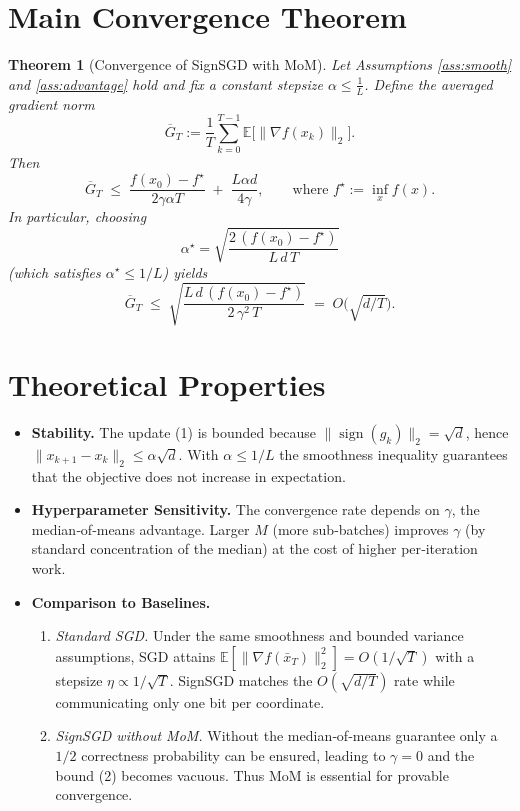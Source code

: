 \documentclass{article}
\newtheorem{theorem}{Theorem}
\newcommand{\sign}{\operatorname{sign}}
\newcommand{\EE}{\mathbb{E}}
\begin{document}
\section*{Main Convergence Theorem}
\begin{theorem}[Convergence of SignSGD with MoM]\label{thm:main}
Let Assumptions \ref{ass:smooth} and \ref{ass:advantage} hold and fix a constant stepsize $\alpha\le \frac{1}{L}$.  
Define the averaged gradient norm
\[
\overline{G}_{T}:=\frac{1}{T}\sum_{k=0}^{T-1}\EE\!\bigl[\|\nabla f(x_{k})\|_{2}\bigr].
\]
Then
\begin{equation}
\overline{G}_{T}\;\le\;
\frac{f(x_{0})-f^{\star}}{2\gamma\alpha T}
\;+\;
\frac{L\alpha d}{4\gamma},
\qquad\text{where }f^{\star}:=\inf_{x}f(x).
\tag{2}
\end{equation}
In particular, choosing
\[
\alpha^{\star}= \sqrt{\frac{2\,(f(x_{0})-f^{\star})}{L\,d\,T}}
\]
(which satisfies $\alpha^{\star}\le 1/L$) yields
\[
\overline{G}_{T}\;\le\;
\sqrt{\frac{L\,d\,(f(x_{0})-f^{\star})}{2\,\gamma^{2}\,T}}
\;=\;O\!\bigl(\sqrt{d/T}\bigr).
\]
\end{theorem}

\section*{Theoretical Properties}
\begin{itemize}
\item \textbf{Stability.} The update (1) is bounded because $ \| \sign(g_{k})\|_{2}= \sqrt{d}$, hence $ \|x_{k+1}-x_{k}\|_{2}\le\alpha\sqrt{d}$.  With $\alpha\le 1/L$ the smoothness inequality guarantees that the objective does not increase in expectation.
\item \textbf{Hyperparameter Sensitivity.} The convergence rate depends on $\gamma$, the median‑of‑means advantage. Larger $M$ (more sub‑batches) improves $\gamma$ (by standard concentration of the median) at the cost of higher per‑iteration work.
\item \textbf{Comparison to Baselines.}
    \begin{enumerate}
        \item \emph{Standard SGD.} Under the same smoothness and bounded variance assumptions, SGD attains $\EE[\|\nabla f(\bar{x}_{T})\|_{2}^{2}]=O(1/\sqrt{T})$ with a stepsize $\eta\propto 1/\sqrt{T}$.  SignSGD matches the $O(\sqrt{d/T})$ rate while communicating only one bit per coordinate.
        \item \emph{SignSGD without MoM.} Without the median‑of‑means guarantee only a $1/2$ correctness probability can be ensured, leading to $\gamma=0$ and the bound (2) becomes vacuous.  Thus MoM is essential for provable convergence.
    \end{enumerate}
\end{itemize}
\end{document}
